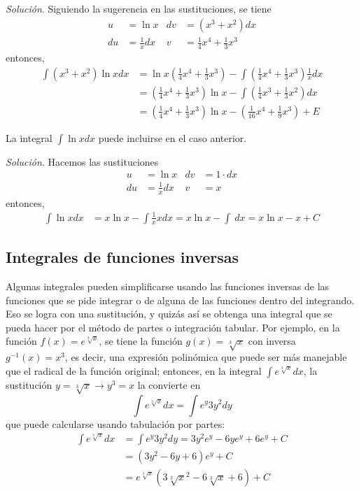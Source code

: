 \textit{Solución}. Siguiendo la sugerencia en las sustituciones, se tiene
\begin{align*}
u&=\ln x & dv&=(x^{3}+x^{2})dx\\
du&=\frac{1}{x}dx & v&=\frac{1}{4}x^{4}+\frac{1}{3}x^{3}
\end{align*}
entonces,
\begin{align*}
\int (x^{3}+x^{2})\ln xdx&=\ln x\left(\frac{1}{4}x^{4}+\frac{1}{3}x^{3}\right)-\int \left(\frac{1}{4}x^{4}+\frac{1}{3}x^{3}\right)\frac{1}{x}dx\\
&=\left(\frac{1}{4}x^{4}+\frac{1}{3}x^{3}\right)\ln x-\int\left( \frac{1}{4}x^{3}+\frac{1}{3}x^{2}\right) dx\\
&=\left(\frac{1}{4}x^{4}+\frac{1}{3}x^{3}\right)\ln x-\left(\frac{1}{16}x^{4}+\frac{1}{9}x^{3}\right)+E
\end{align*}

\begin{ejemplo}
\textnormal{La integral \textit{$\displaystyle{\int \ln xdx}$} puede incluirse en el caso anterior.}
\end{ejemplo}

\textit{Solución}. Hacemos las sustituciones
\begin{align*}
u&=\ln x & dv&=1\cdot dx\\
du&=\frac{1}{x}dx & v&=x
\end{align*}
entonces,
\begin{align*}
\int \ln xdx&=x\ln x-\int \frac{1}{x}xdx=x\ln x-\int\ dx=x\ln x-x+C
\end{align*}

\subsection*{Integrales de funciones inversas}

Algunas integrales pueden simplificarse usando las funciones inversas de las funciones que se pide integrar o de alguna de las funciones dentro del integrando. Eso se logra con una sustitución, y quizás así se obtenga una integral que se pueda hacer por el método de partes o integración tabular. Por ejemplo, en la función $f(x)=e^{\sqrt[3]{x}}$, se tiene la función $g(x)=\sqrt[3]{x}$ con inversa $g^{-1}(x)=x^3$, es decir, una expresión polinómica que puede ser más manejable que el radical de la función original; entonces, en la integral $\displaystyle{\int e^{\sqrt[3]{x}}dx}$, la sustitución $y=\sqrt[3]{x}\rightarrow y^3=x$ la convierte en
\[
\int e^{\sqrt[3]{x}}dx=\int e^{y}3y^{2}dy
\]
que puede calcularse usando tabulación por partes:
\begin{align*}
\int e^{\sqrt[3]{x}}dx&=\int e^{y}3y^{2}dy=3y^{2}e^{y}-6ye^{y}+6e^{y}+C\\
&=(3y^{2}-6y+6)e^{y}+C\\
&=e^{\sqrt[3]{x}}(3\sqrt[3]{x}^{2}-6\sqrt[3]{x}%
+6)+C
\end{align*}

